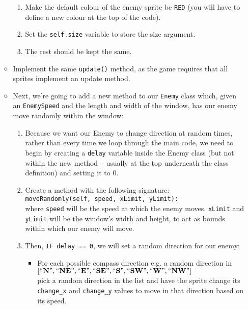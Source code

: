 \documentclass[11pt]{report}
\begin{document}
\begin{enumerate}
\begin{itemize}
\begin{enumerate}
			\item Make the default colour of the enemy sprite be {\tt RED} (you will have to define a new colour at the top of the code).

			\item Set the {\tt self.size} variable to store the size argument.

			\item The rest should be kept the same.
		\end{enumerate}

		\item Implement the same \verb|update()| method, as the game requires that all sprites implement an update method.

		\item Next, we're going to add a new method to our {\tt Enemy} class which, given an {\tt EnemySpeed} and the length and width of the window, has our enemy move randomly within the window:

		\begin{enumerate}
			\item Because we want our Enemy to change direction at random times, rather than every time we loop through the main code, we need to begin by creating a {\tt delay} variable inside the Enemy class (but not within the new method -- usually at the top underneath the class definition) and setting it to $0$.

			\item Create a method with the following signature:\\
			\verb|moveRandomly(self, speed, xLimit, yLimit):|\\
			where {\tt speed} will be the speed at which the enemy moves. {\tt xLimit} and {\tt yLimit} will be the window's width and height, to act as bounds within which our enemy will move.

			\item Then, {\tt IF delay == 0}, we will set a random direction for our enemy:

			\begin{itemize}
				\item For each possible compass direction e.g. a random direction in \\
				$[\mathbf{``N", ``NE", ``E", ``SE", ``S", ``SW", ``W", ``NW"}]$\\
				pick a random direction in the list and have the sprite change its {\tt change\_x} and {\tt change\_y} values to move in that direction based on its speed.


\end{itemize}
\end{enumerate}
\end{itemize}
\end{enumerate}
\end{document}
